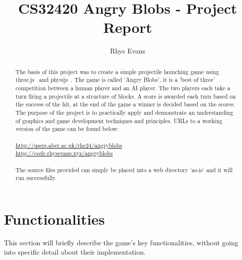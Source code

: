 \documentclass[runningheads]{llncs}
\begin{document}
	\title{CS32420 Angry Blobs - Project Report}
	\author{Rhys Evans}
	\maketitle
	
	\begin{abstract}
		The basis of this project was to create a simple projectile launching game using three.js~\cite{ref_threejs} and physijs~\cite{ref_physijs}. The game is called 'Angry Blobs', it is a 'best of three' competition between a human player and an AI player. The two players each take a turn firing a projectile at a structure of blocks. A score is awarded each turn based on the success of the hit, at the end of the game a winner is decided based on the scores. The purpose of the project is to practically apply and demonstrate an understanding of graphics and game development techniques and principles. URLs to a working version of the game can be found below:\\\\ \url{http://users.aber.ac.uk/rhe24/angryblobs} \\ \url{http://code.rhysevans.xyz/angryblobs}\\\\ The source files provided can simply be placed into a web directory 'as-is' and it will run successfully.
	\end{abstract}
	
	\newpage
	\section{Functionalities} \label{functionalities}
	This section will briefly describe the game's key functionalities, without going into specific detail about their implementation.
\end{document}
